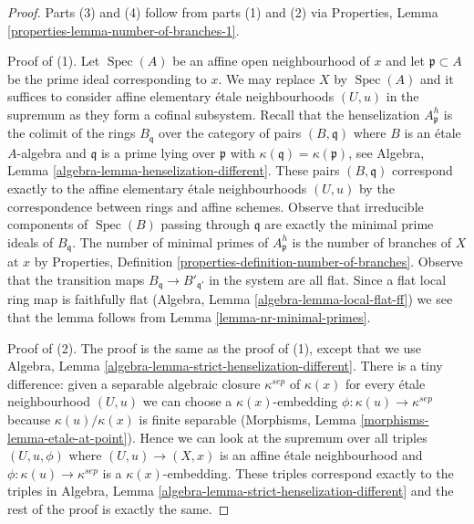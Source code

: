 \documentclass[10pt,a4paper]{amsart}
\theoremstyle{plain}
\theoremstyle{definition}
\theoremstyle{remark}
\numberwithin{equation}{subsection}
\def\Spec{\mathop{\mathrm{Spec}}}
\begin{document}
\begin{proof}
Parts (3) and (4) follow from parts (1) and (2) via
Properties, Lemma \ref{properties-lemma-number-of-branches-1}.

\medskip\noindent
Proof of (1). Let $\Spec(A)$ be an affine open neighbourhood
of $x$ and let $\mathfrak p \subset A$ be the prime ideal
corresponding to $x$. We may replace $X$ by $\Spec(A)$ and
it suffices to consider affine elementary \'etale neighbourhoods
$(U, u)$ in the supremum as they form a cofinal subsystem.
Recall that the henselization $A_\mathfrak p^h$
is the colimit of the rings $B_\mathfrak q$ over the category
of pairs $(B, \mathfrak q)$ where $B$ is an \'etale $A$-algebra
and $\mathfrak q$ is a prime lying over $\mathfrak p$ with
$\kappa(\mathfrak q) = \kappa(\mathfrak p)$, see
Algebra, Lemma \ref{algebra-lemma-henselization-different}.
These pairs $(B, \mathfrak q)$ correspond exactly to
the affine elementary \'etale neighbourhoods $(U, u)$
by the correspondence between rings and affine schemes.
Observe that irreducible components of $\Spec(B)$
passing through $\mathfrak q$ are exactly the minimal
prime ideals of $B_\mathfrak q$. The number of minimal
primes of $A_\mathfrak p^h$ is the number of branches
of $X$ at $x$ by Properties, Definition
\ref{properties-definition-number-of-branches}.
Observe that the transition
maps $B_\mathfrak q \to B'_{\mathfrak q'}$ in the system
are all flat. Since a flat local ring map is faithfully flat
(Algebra, Lemma \ref{algebra-lemma-local-flat-ff})
we see that the lemma follows
from Lemma \ref{lemma-nr-minimal-primes}.

\medskip\noindent
Proof of (2). The proof is the same as the proof of (1), except that we use
Algebra, Lemma \ref{algebra-lemma-strict-henselization-different}.
There is a tiny difference: given a separable algebraic closure
$\kappa^{sep}$ of $\kappa(x)$ for every \'etale neighbourhood
$(U, u)$ we can choose a $\kappa(x)$-embedding
$\phi : \kappa(u) \to \kappa^{sep}$
because $\kappa(u)/\kappa(x)$ is finite separable
(Morphisms, Lemma \ref{morphisms-lemma-etale-at-point}).
Hence we can look at the supremum over all triples
$(U, u, \phi)$ where $(U, u) \to (X, x)$ is an affine
\'etale neighbourhood and $\phi : \kappa(u) \to \kappa^{sep}$
is a $\kappa(x)$-embedding. These triples correspond
exactly to the triples in
Algebra, Lemma \ref{algebra-lemma-strict-henselization-different}
and the rest of the proof is exactly the same.
\end{proof}
\end{document}
